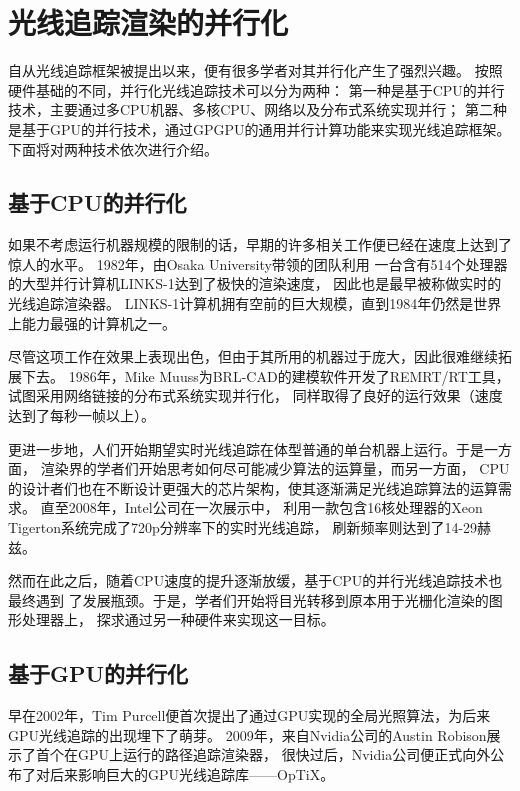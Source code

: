 \section{光线追踪渲染的并行化}

自从光线追踪框架被提出以来，便有很多学者对其并行化产生了强烈兴趣。
按照硬件基础的不同，并行化光线追踪技术可以分为两种：
第一种是基于CPU的并行技术，主要通过多CPU机器、多核CPU、网络以及分布式系统实现并行；
第二种是基于GPU的并行技术，通过GPGPU的通用并行计算功能来实现光线追踪框架。
下面将对两种技术依次进行介绍。

\subsection{基于CPU的并行化}

如果不考虑运行机器规模的限制的话，早期的许多相关工作便已经在速度上达到了惊人的水平。
1982年，由Osaka University带领的团队利用
一台含有514个处理器的大型并行计算机LINKS-1达到了极快的渲染速度\cite{LINKS1}，
因此也是最早被称做实时的光线追踪渲染器。
LINKS-1计算机拥有空前的巨大规模，直到1984年仍然是世界上能力最强的计算机之一。

尽管这项工作在效果上表现出色，但由于其所用的机器过于庞大，因此很难继续拓展下去。
1986年，Mike Muuss为BRL-CAD的建模软件开发了REMRT/RT工具，试图采用网络链接的分布式系统实现并行化，
同样取得了良好的运行效果（速度达到了每秒一帧以上）。

更进一步地，人们开始期望实时光线追踪在体型普通的单台机器上运行。于是一方面，
渲染界的学者们开始思考如何尽可能减少算法的运算量，而另一方面，
CPU的设计者们也在不断设计更强大的芯片架构，使其逐渐满足光线追踪算法的运算需求。
直至2008年，Intel公司在一次展示中，
利用一款包含16核处理器的Xeon Tigerton系统完成了720p分辨率下的实时光线追踪，
刷新频率则达到了14-29赫兹\cite{QuakeWars}。

然而在此之后，随着CPU速度的提升逐渐放缓，基于CPU的并行光线追踪技术也最终遇到
了发展瓶颈。于是，学者们开始将目光转移到原本用于光栅化渲染的图形处理器上，
探求通过另一种硬件来实现这一目标。

\subsection{基于GPU的并行化} 

早在2002年，Tim Purcell便首次提出了通过GPU实现的全局光照算法，为后来GPU光线追踪的出现埋下了萌芽。
2009年，来自Nvidia公司的Austin Robison展示了首个在GPU上运行的路径追踪渲染器，
很快过后，Nvidia公司便正式向外公布了对后来影响巨大的GPU光线追踪库——OpTiX\cite{parker2010optix}。

